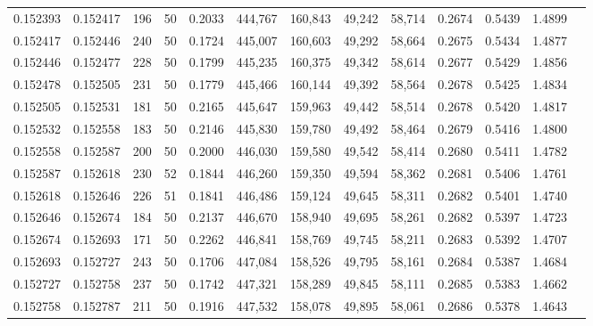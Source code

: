 \begin{tabular}{rrrrrrrrrrrrr}
0.152393 & 0.152417 &   196 &  50 &                                     0.2033 & 444,767 & 160,843 &  49,242 &  58,714 & 0.2674 & 0.5439 & 1.4899 \\
0.152417 & 0.152446 &   240 &  50 &                                     0.1724 & 445,007 & 160,603 &  49,292 &  58,664 & 0.2675 & 0.5434 & 1.4877 \\
0.152446 & 0.152477 &   228 &  50 &                                     0.1799 & 445,235 & 160,375 &  49,342 &  58,614 & 0.2677 & 0.5429 & 1.4856 \\
0.152478 & 0.152505 &   231 &  50 &                                     0.1779 & 445,466 & 160,144 &  49,392 &  58,564 & 0.2678 & 0.5425 & 1.4834 \\
0.152505 & 0.152531 &   181 &  50 &                                     0.2165 & 445,647 & 159,963 &  49,442 &  58,514 & 0.2678 & 0.5420 & 1.4817 \\
0.152532 & 0.152558 &   183 &  50 &                                     0.2146 & 445,830 & 159,780 &  49,492 &  58,464 & 0.2679 & 0.5416 & 1.4800 \\
0.152558 & 0.152587 &   200 &  50 &                                     0.2000 & 446,030 & 159,580 &  49,542 &  58,414 & 0.2680 & 0.5411 & 1.4782 \\
0.152587 & 0.152618 &   230 &  52 &                                     0.1844 & 446,260 & 159,350 &  49,594 &  58,362 & 0.2681 & 0.5406 & 1.4761 \\
0.152618 & 0.152646 &   226 &  51 &                                     0.1841 & 446,486 & 159,124 &  49,645 &  58,311 & 0.2682 & 0.5401 & 1.4740 \\
0.152646 & 0.152674 &   184 &  50 &                                     0.2137 & 446,670 & 158,940 &  49,695 &  58,261 & 0.2682 & 0.5397 & 1.4723 \\
0.152674 & 0.152693 &   171 &  50 &                                     0.2262 & 446,841 & 158,769 &  49,745 &  58,211 & 0.2683 & 0.5392 & 1.4707 \\
0.152693 & 0.152727 &   243 &  50 &                                     0.1706 & 447,084 & 158,526 &  49,795 &  58,161 & 0.2684 & 0.5387 & 1.4684 \\
0.152727 & 0.152758 &   237 &  50 &                                     0.1742 & 447,321 & 158,289 &  49,845 &  58,111 & 0.2685 & 0.5383 & 1.4662 \\
0.152758 & 0.152787 &   211 &  50 &                                     0.1916 & 447,532 & 158,078 &  49,895 &  58,061 & 0.2686 & 0.5378 & 1.4643 \\

\end{tabular}
